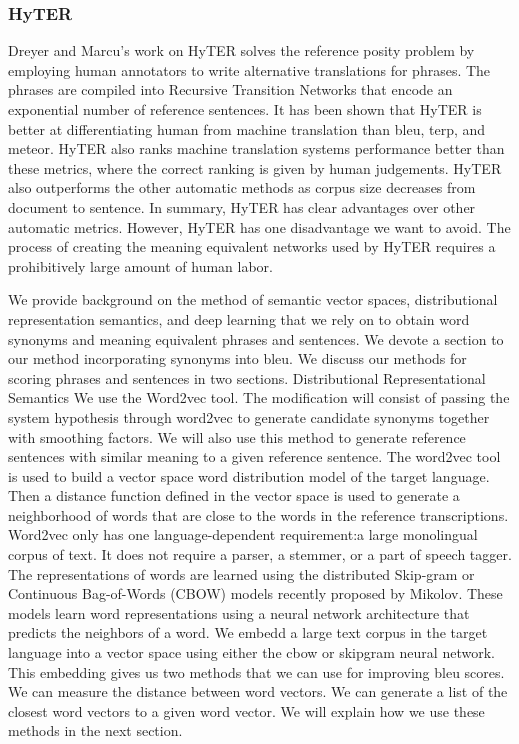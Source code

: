 \subsubsection{HyTER}
\label{sec:hyter}


Dreyer and Marcu's work  on HyTER  solves the reference posity problem by employing human annotators to write alternative translations for phrases. 
The phrases are compiled into Recursive Transition Networks that encode an exponential number of reference sentences. 
It has been shown that HyTER is better at differentiating human from machine translation than bleu, terp, and meteor. 
HyTER also ranks machine translation systems performance better than these metrics, where the correct ranking is given by human judgements. 
HyTER also outperforms the other automatic methods as corpus size decreases   from document to sentence. 
In summary, HyTER has clear advantages over other automatic metrics. 
However,   HyTER has one disadvantage we want to avoid. 
The process of creating the meaning equivalent networks used by HyTER requires a prohibitively large amount of human labor. 

We provide background on the method of semantic vector spaces, distributional representation semantics, and deep learning that we rely on to obtain word synonyms and meaning equivalent phrases and sentences. 
We devote a section to our method incorporating synonyms into bleu. 
We discuss our methods for scoring phrases and sentences in two sections. 
Distributional Representational Semantics
We use the Word2vec  tool. 
The modification will consist of  passing the system hypothesis through word2vec to generate candidate synonyms together with smoothing factors.
We will also use this method to generate reference sentences with similar meaning to a given reference sentence.
The word2vec tool is used to build a vector space word distribution model of the target language. 
Then a distance function defined in the vector space is used to generate a neighborhood of words that are close to the words in the reference transcriptions. 
Word2vec only has one language-dependent requirement:a large monolingual corpus of text. 
It does not require a parser, a stemmer, or a part of speech tagger. 
The representations of words are learned using the distributed Skip-gram or Continuous Bag-of-Words (CBOW) models recently proposed by Mikolov. 
These models learn word representations using a neural network architecture that predicts the neighbors of a word.
We embedd  a large text corpus in the target language into a vector space using either the cbow or skipgram neural network. 
This embedding gives us two methods that we can use for improving bleu scores. 
We can measure the distance between word vectors. 
We can generate a list of the closest word vectors to a given word vector. 
We will explain how we use these methods in the next section. 

